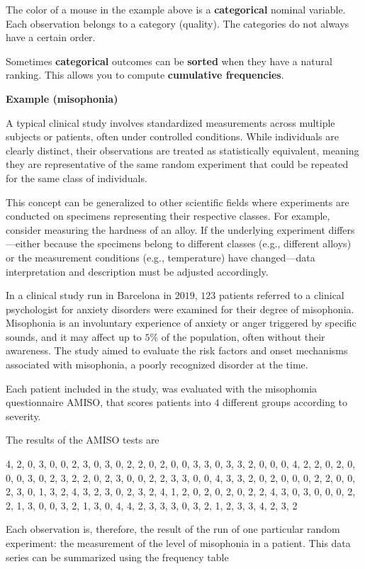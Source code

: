 \documentclass[
]{book}
\begin{document}
The color of a mouse in the example above is a \textbf{categorical} nominal variable. Each observation belongs to a category (quality). The categories do not always have a certain order.

Sometimes \textbf{categorical} outcomes can be \textbf{sorted} when they have a natural ranking. This allows you to compute \textbf{cumulative frequencies}.

\textbf{Example (misophonia)}

A typical clinical study involves standardized measurements across multiple subjects or patients, often under controlled conditions. While individuals are clearly distinct, their observations are treated as statistically equivalent, meaning they are representative of the same random experiment that could be repeated for the same class of individuals.

This concept can be generalized to other scientific fields where experiments are conducted on specimens representing their respective classes. For example, consider measuring the hardness of an alloy. If the underlying experiment differs---either because the specimens belong to different classes (e.g., different alloys) or the measurement conditions (e.g., temperature) have changed---data interpretation and description must be adjusted accordingly.

In a clinical study run in Barcelona in \(2019\), \(123\) patients referred to a clinical psychologist for anxiety disorders were examined for their degree of misophonia. Misophonia is an involuntary experience of anxiety or anger triggered by specific sounds, and it may affect up to \(5\%\) of the population, often without their awareness. The study aimed to evaluate the risk factors and onset mechanisms associated with misophonia, a poorly recognized disorder at the time.

Each patient included in the study, was evaluated with the misophomia questionnaire AMISO, that scores patients into \(4\) different groups according to severity.

The results of the AMISO tests are

4, 2, 0, 3, 0, 0, 2, 3, 0, 3, 0, 2, 2, 0, 2, 0, 0, 3, 3, 0, 3, 3, 2, 0, 0, 0, 4, 2, 2, 0, 2, 0, 0, 0, 3, 0, 2, 3, 2, 2, 0, 2, 3, 0, 0, 2, 2, 3, 3, 0, 0, 4, 3, 3, 2, 0, 2, 0, 0, 0, 2, 2, 0, 0, 2, 3, 0, 1, 3, 2, 4, 3, 2, 3, 0, 2, 3, 2, 4, 1, 2, 0, 2, 0, 2, 0, 2, 2, 4, 3, 0, 3, 0, 0, 0, 2, 2, 1, 3, 0, 0, 3, 2, 1, 3, 0, 4, 4, 2, 3, 3, 3, 0, 3, 2, 1, 2, 3, 3, 4, 2, 3, 2

Each observation is, therefore, the result of the run of one particular random experiment: the measurement of the level of misophonia in a patient. This data series can be summarized using the frequency table
\end{document}
